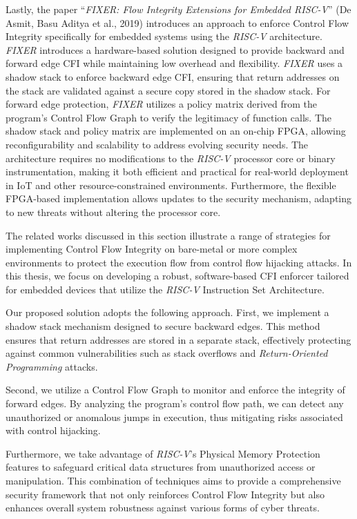 Lastly, the paper ``\textit{FIXER: Flow Integrity Extensions for Embedded RISC-V}''
(De Asmit, Basu Aditya et al., 2019)\cite{Fixer} introduces an approach to
enforce Control Flow Integrity specifically for embedded systems using the
\textit{RISC-V} architecture. \textit{FIXER} introduces a hardware-based solution
designed to provide backward and forward edge CFI while maintaining low overhead
and flexibility. \textit{FIXER} uses a shadow stack to enforce backward edge CFI,
ensuring that return addresses on the stack are validated against a secure copy
stored in the shadow stack. For forward edge protection, \textit{FIXER} utilizes
a policy matrix derived from the program's Control Flow Graph to verify the legitimacy
of function calls. The shadow stack and policy matrix are implemented on an on-chip
FPGA, allowing reconfigurability and scalability to address evolving security needs.
The architecture requires no modifications to the \textit{RISC-V} processor core
or binary instrumentation, making it both efficient and practical for real-world
deployment in IoT and other resource-constrained environments. Furthermore, the
flexible FPGA-based implementation allows updates to the security mechanism, adapting
to new threats without altering the processor core.

The related works discussed in this section illustrate a range of strategies for
implementing Control Flow Integrity on bare-metal or more complex environments to
protect the execution flow from control flow hijacking attacks. In this thesis, we
focus on developing a robust, software-based CFI enforcer tailored for embedded
devices that utilize the \textit{RISC-V} Instruction Set Architecture.

Our proposed solution adopts the following approach. First, we implement a shadow
stack mechanism designed to secure backward edges. This method ensures that
return addresses are stored in a separate stack, effectively protecting against common
vulnerabilities such as stack overflows and \textit{Return-Oriented Programming}
attacks.

Second, we utilize a Control Flow Graph to monitor and enforce the integrity of forward
edges. By analyzing the program's control flow path, we can detect any unauthorized
or anomalous jumps in execution, thus mitigating risks associated with control
hijacking.

Furthermore, we take advantage of \textit{RISC-V}'s Physical Memory Protection
features to safeguard critical data structures from unauthorized access or
manipulation. This combination of techniques aims to provide a comprehensive security
framework that not only reinforces Control Flow Integrity but also enhances overall
system robustness against various forms of cyber threats.